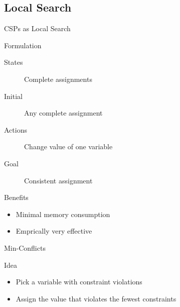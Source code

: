 \documentclass[12pt]{beamer}
\begin{document}
\subsection{Local Search}
\begin{frame}{CSPs as Local Search}
	\begin{block}{Formulation}
		\begin{description}
			\item[States] Complete assignments
			\item[Initial] Any complete assignment
			\item[Actions] Change value of one variable
			\item[Goal] Consistent assignment
		\end{description}
	\end{block}
	\pause
	\begin{block}{Benefits}
		\begin{itemize}
			\item Minimal memory consumption
			\item Emprically very effective
		\end{itemize}
	\end{block}
\end{frame}
\begin{frame}{Min-Conflicts}
	\begin{block}{Idea}
		\begin{itemize}
			\item Pick a variable with constraint violations
			\item Assign the value that violates the fewest constraints
		\end{itemize}
	\end{block}
	\begin{center}
	\end{center}
\end{frame}
\end{document}
